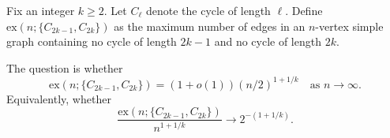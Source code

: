 Fix an integer $k\ge 2$. Let $C_\ell$ denote the cycle of length $\ell$.
Define
$\mathrm{ex}(n;\{C_{2k-1},C_{2k}\})$ as the maximum number of edges in an $n$-vertex simple graph containing no cycle of length $2k-1$ and no cycle of length $2k$.

The question is whether
\[
\mathrm{ex}(n;\{C_{2k-1},C_{2k}\}) = (1+o(1))(n/2)^{1+1/k}
\quad\text{as }n\to\infty.
\]
Equivalently, whether
\[
\frac{\mathrm{ex}(n;\{C_{2k-1},C_{2k}\})}{n^{1+1/k}}\to 2^{-(1+1/k)}.
\]
